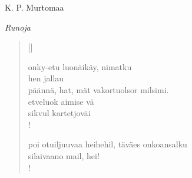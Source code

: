 \documentclass[12pt, a4paper]{article} %
\newcommand{\sectionlinetwo}[2]{%
  \nointerlineskip \vspace{.5\baselineskip}\hspace{\fill}
  {\resizebox{0.5\linewidth}{1.2ex}
    {\pgfornament[color = #1]{#2}
    }}%
    \hspace{\fill}
    \par\nointerlineskip \vspace{.5\baselineskip}
  }
\begin{document}
\begin{titlepage}

\centering

{\fontsize{45}{50}\selectfont K. P. Murtomaa\par}

\vspace{5cm}
\sectionlinetwo{black}{80}
\vspace{5cm}

{\fontsize{38}{60}\selectfont \itshape Runoja\par}



\end{titlepage}


%

\settowidth{\versewidth}{ASDFASDFDAFDFAASDSAasdfasdf}
\begin{verse}[\versewidth]

onky-etu luonäikäy, nimatku \\
hen jallau \\
päännä, hat, mät vakortuolsor milsimi. \\
etveluok aimise vä \\
sikvul kartetjoväi \\!



poi otuiljuuvaa heihehil, täväes onkoansalku \\
silaivaano mail, hei! \\!


\end{verse}
\newpage



\newpage
\end{document}
